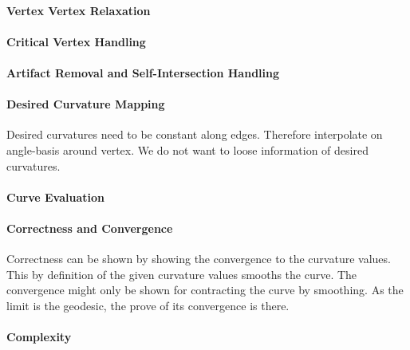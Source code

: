 \documentclass{stdlocal}
\begin{document}
  \paragraph{Vertex Vertex Relaxation}
  \paragraph{Critical Vertex Handling}
  \paragraph{Artifact Removal and Self-Intersection Handling}
  \paragraph{Desired Curvature Mapping}
    Desired curvatures need to be constant along edges.
    Therefore interpolate on angle-basis around vertex.
    We do not want to loose information of desired curvatures.
  \paragraph{Curve Evaluation}
  \paragraph{Correctness and Convergence}
    Correctness can be shown by showing the convergence to the curvature values.
    This by definition of the given curvature values smooths the curve.
    The convergence might only be shown for contracting the curve by smoothing.
    As the limit is the geodesic, the prove of its convergence is there.
  \paragraph{Complexity}

\end{document}
